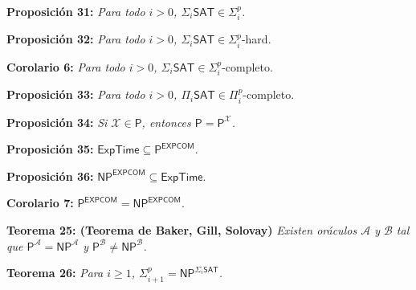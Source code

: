 \documentclass{article}
\begin{document}
\begin{flushleft}
  \textbf{Proposición 31:}
  \textit{Para todo $i > 0$, $\Sigma_i \mathsf{SAT} \in \Sigma^p_i$.}
\end{flushleft}

\begin{flushleft}
  \textbf{Proposición 32:}
  \textit{Para todo $i > 0$, $\Sigma_i \mathsf{SAT} \in \Sigma^p_i$}-hard.
\end{flushleft}

\begin{flushleft}
  \textbf{Corolario 6:}
  \textit{Para todo $i > 0$, $\Sigma_i \mathsf{SAT} \in \Sigma^p_i$}-completo.
\end{flushleft}

\begin{flushleft}
  \textbf{Proposición 33:}
  \textit{Para todo $i > 0$, $\Pi_i \mathsf{SAT} \in \Pi^p_i$}-completo.
\end{flushleft}

\begin{flushleft}
  \textbf{Proposición 34:}
  \textit{Si $\mathcal{X} \in \mathsf{P}$, entonces $\mathsf{P} = \mathsf{P}^\mathcal{X}$.}
\end{flushleft}

\begin{flushleft}
  \textbf{Proposición 35:}
  $\mathsf{ExpTime \subseteq P^{EXPCOM}}$.
\end{flushleft}

\begin{flushleft}
  \textbf{Proposición 36:}
  $\mathsf{NP^{EXPCOM} \subseteq ExpTime}$.
\end{flushleft}

\begin{flushleft}
  \textbf{Corolario 7:}
  $\mathsf{P^{EXPCOM} = NP^{EXPCOM}}$.
\end{flushleft}

\begin{flushleft}
  \textbf{Teorema 25: \hypertarget{baker}{\textcolor{Bittersweet}{(Teorema de Baker, Gill, Solovay)}}}
  \textit{Existen oráculos $\mathcal{A}$ y $\mathcal{B}$ tal que $\mathsf{P}^\mathcal{A} = \mathsf{NP}^
  \mathcal{A}$ y $\mathsf{P}^\mathcal{B} \neq \mathsf{NP}^\mathcal{B}$.}
\end{flushleft}

\begin{flushleft}
  \textbf{Teorema 26:}
  \textit{Para $i \geq 1$, $\Sigma^p_{i+1} = \mathsf{NP}^{\Sigma_i \mathsf{SAT}}$.}
\end{flushleft}
\end{document}
